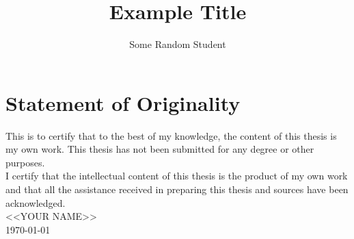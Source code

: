 \documentclass{usydthesis}
\title{Example Title}
\author{Some Random Student}
\begin{document}
\pagestyle{empty}
\maketitle

\section*{Statement of Originality}

This is to certify that to the best of my knowledge, the content of this thesis is my own work. This thesis has not been submitted for any degree or other purposes.\\

\noindent I certify that the intellectual content of this thesis is the product of my own work and that all the assistance received in preparing this thesis and sources have been acknowledged.
\\

\noindent <<YOUR NAME>>\\
\today

\cleardoublepage{}
\pagestyle{plain}
\end{document}
